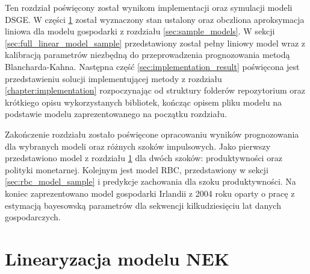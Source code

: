 
Ten rozdział poświęcony został wynikom implementacji oraz symulacji modeli DSGE. W części \ref{sec:results:model} został wyznaczony stan ustalony oraz obczliona aproksymacja liniowa dla modelu gospodarki z rozdziału \ref{sec:sample_models}. W sekcji \ref{sec:full_linear_model_sample} przedstawiony został pełny liniowy model wraz z kalibracją parametrów niezbędną do przeprowadzenia prognozowania metodą Blancharda-Kahna. Następna część \ref{sec:implementation_result} poświęcona jest przedstawieniu solucji implementującej metody z rozdziału \ref{chapter:implementation} rozpoczynając od struktury folderów repozytorium oraz krótkiego opisu wykorzystanych bibliotek, kończąc opisem pliku modelu na podstawie modelu zaprezentowanego na początku rozdziału.

Zakończenie rozdziału zostało poświęcone opracowaniu wyników prognozowania dla wybranych modeli oraz różnych szoków impulsowych. Jako pierwszy przedstawiono model z rozdziału \ref{sec:results:model} dla dwóch szoków: produktywności oraz polityki monetarnej. Kolejnym jest model RBC, przedstawiony w sekcji \ref{sec:rbc_model_sample} i predykcje zachowania dla szoku produktywności. Na koniec zaprezentowano model gospodarki Irlandii z 2004 roku oparty o pracę \cite{NBERw10309} z estymacją bayesowską parametrów dla sekwencji kilkudziesięciu lat danych gospodarczych.

\section{Linearyzacja modelu NEK}
\label{sec:results:model}

